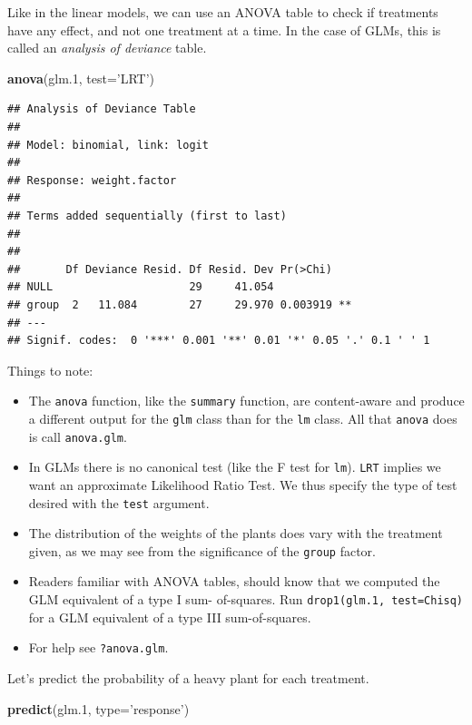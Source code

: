 \documentclass[]{book}
\newenvironment{Shaded}{\begin{snugshade}}{\end{snugshade}}
\newcommand{\DataTypeTok}[1]{\textcolor[rgb]{0.13,0.29,0.53}{#1}}
\newcommand{\FloatTok}[1]{\textcolor[rgb]{0.00,0.00,0.81}{#1}}
\newcommand{\KeywordTok}[1]{\textcolor[rgb]{0.13,0.29,0.53}{\textbf{#1}}}
\newcommand{\NormalTok}[1]{#1}
\newcommand{\StringTok}[1]{\textcolor[rgb]{0.31,0.60,0.02}{#1}}
\providecommand{\tightlist}{%
  \setlength{\itemsep}{0pt}\setlength{\parskip}{0pt}}
\theoremstyle{definition}
\theoremstyle{definition}
\theoremstyle{definition}
\theoremstyle{remark}
\begin{document}
Like in the linear models, we can use an ANOVA table to check if treatments have any effect, and not one treatment at a time.
In the case of GLMs, this is called an \emph{analysis of deviance} table.

\begin{Shaded}
\begin{Highlighting}[]
\KeywordTok{anova}\NormalTok{(glm}\FloatTok{.1}\NormalTok{, }\DataTypeTok{test=}\StringTok{'LRT'}\NormalTok{)}
\end{Highlighting}
\end{Shaded}

\begin{verbatim}
## Analysis of Deviance Table
## 
## Model: binomial, link: logit
## 
## Response: weight.factor
## 
## Terms added sequentially (first to last)
## 
## 
##       Df Deviance Resid. Df Resid. Dev Pr(>Chi)   
## NULL                     29     41.054            
## group  2   11.084        27     29.970 0.003919 **
## ---
## Signif. codes:  0 '***' 0.001 '**' 0.01 '*' 0.05 '.' 0.1 ' ' 1
\end{verbatim}

Things to note:

\begin{itemize}
\tightlist
\item
  The \texttt{anova} function, like the \texttt{summary} function, are content-aware and produce a different output for the \texttt{glm} class than for the \texttt{lm} class. All that \texttt{anova} does is call \texttt{anova.glm}.
\item
  In GLMs there is no canonical test (like the F test for \texttt{lm}). \texttt{LRT} implies we want an approximate Likelihood Ratio Test.
  We thus specify the type of test desired with the \texttt{test} argument.
\item
  The distribution of the weights of the plants does vary with the treatment given, as we may see from the significance of the \texttt{group} factor.
\item
  Readers familiar with ANOVA tables, should know that we computed the GLM equivalent of a type I sum- of-squares.
  Run \texttt{drop1(glm.1,\ test=\textquotesingle{}Chisq\textquotesingle{})} for a GLM equivalent of a type III sum-of-squares.
\item
  For help see \texttt{?anova.glm}.
\end{itemize}

Let's predict the probability of a heavy plant for each treatment.

\begin{Shaded}
\begin{Highlighting}[]
\KeywordTok{predict}\NormalTok{(glm}\FloatTok{.1}\NormalTok{, }\DataTypeTok{type=}\StringTok{'response'}\NormalTok{)}
\end{Highlighting}
\end{Shaded}
\end{document}
